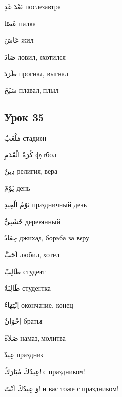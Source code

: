 \documentclass[a5paper]{article}
\newcommand\textstyleDropCaps[1]{#1}
\newcommand\textstyleCaptioncharacters[1]{#1}
\begin{document}
\textstyleCaptioncharacters{بَعْدَ غَدٍ }\textstyleDropCaps{послезавтра‎}

\textstyleCaptioncharacters{عَصًا }\textstyleDropCaps{палка‎}

\textstyleCaptioncharacters{عَاشَ }\textstyleDropCaps{жил‎}

\textstyleCaptioncharacters{صَادَ }\textstyleDropCaps{ловил, охотился‎}

\textstyleCaptioncharacters{طَرَدَ }\textstyleDropCaps{прогнал, выгнал‎}

\textstyleCaptioncharacters{سَبَحَ }\textstyleDropCaps{плавал, плыл‎}

\subsection[Урок 35‎]{\textstyleDropCaps{Урок 35‎}}
\textstyleCaptioncharacters{مَلْعَبٌ }\textstyleDropCaps{стадион‎}

\textstyleCaptioncharacters{كُرَةُ الْقَدَمِ }\textstyleDropCaps{футбол‎}

\textstyleCaptioncharacters{دِينٌ }\textstyleDropCaps{религия, вера‎}

\textstyleCaptioncharacters{يَوْمٌ }\textstyleDropCaps{день‎}

\textstyleCaptioncharacters{يَوْمُ الْعِيدِ }\textstyleDropCaps{праздничный день‎}

\textstyleCaptioncharacters{خَشَبِىٌّ }\textstyleDropCaps{деревянный‎}

\textstyleCaptioncharacters{جِعَادٌ }\textstyleDropCaps{джихад, борьба за веру‎}

\textstyleCaptioncharacters{اَحَبَّ }\textstyleDropCaps{любил, хотел‎}

\textstyleCaptioncharacters{طَالِبٌ }\textstyleDropCaps{студент‎}

\textstyleCaptioncharacters{طَالِبَةٌ }\textstyleDropCaps{студентка‎}

\textstyleCaptioncharacters{اِنْتِهَاءٌ }\textstyleDropCaps{окончание, конец‎}

\textstyleCaptioncharacters{اِخْوَانٌ }\textstyleDropCaps{братья‎}

\textstyleCaptioncharacters{صَلاَةٌ }\textstyleDropCaps{намаз, молитва‎}

\textstyleCaptioncharacters{عِيدٌ }\textstyleDropCaps{праздник‎}

\textstyleCaptioncharacters{عِيدُكَ مُبَارَكٌ!ِ }\textstyleDropCaps{с празд­ником!‎}

\textstyleCaptioncharacters{وَ عِيدُكَ اَنْتَ!ِ }\textstyleDropCaps{и вас тоже с праздником!‎}
\end{document}
